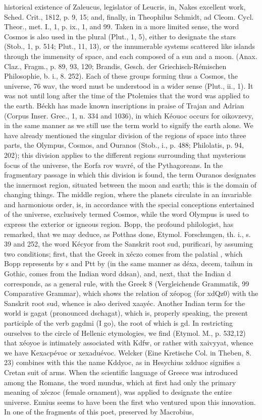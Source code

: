 historical existence of Zaleucus, legislator of Leucris, in, Nakes excellent work, Sched. Crit., 1812, p. 9, 15; and, finally, in Theophilus Schmidt, ad Cleom. Cycl. Theor., met. I., 1, p. ix., 1, and 99. Taken in a more limited sense, the word Cosmos is also used in the plural (Plut., 1, 5), either to designate the stars (Stob., 1, p. 514; Plut., 11, 13), or the innumerable systems scattered like islands through the immensity of space, and each composed of a sun and a moon. (Anax. Claz., Fragm., p. 89, 93, 120; Brandis, Gesch. der Griechisch-R\'{e}mischen Philosophie, b. i., 8. 252). Each of these groups forming thus a Cosmos, the universe, 76 wav, the word must be understood in a wider sense (Plut., ii., 1). It was not until long after the time of the Ptolemies that the word was applied to the earth. B\'{e}ckh has made known inscriptions in praise of Trajan and Adrian (Corpus Inser. Grec., 1, n. 334 and 1036), in which K\'{e}ouoc occurs for oikovzevy, in the same manner as we still use the term world to signify the earth alone. We have already mentioned the singular division of the regions of space into three parts, the Olympus, Cosmos, and Ouranos (Stob., i., p. 488; Philolatis, p. 94, 202); this division applies to the different regions surrounding that mysterious focus of the universe, the Eorfa rov wavr\'{e}, of the Pythagoreans. In the fragmentary passage in which this division is found, the term Ouranos designates the innermost region, situated between the moon and earth; this is the domain of changing things. The middle region, where the planets circulate in an invariable and harmonious order, is, in accordance with the special conceptions entertained of the universe, exclusively termed Cosmos, while the word Olympus is used to express the exterior or igneous region. Bopp, the profound philologist, has remarked, that we may deduce, as Potthas done, Etymol. Forschungen, th. i., s. 39 and 252, the word K\'{e}cyor from the Sanskrit root sud, purificari, by assuming two conditions; first, that the Greek  in x\'{e}czo comes from the palatial , which Bopp represents by s and Ptt by  (in the same manner as d\'{e}xa, decem, taihun in Gothic, comes from the Indian word ddsan), and, next, that the Indian d corresponds, as a general rule, with the Greek 8 (Vergleichende Grammatik,  99 Comparative Grammar), which shows the relation of x\'{e}opog (for xdQz0) with the Sanskrit root sud, whence is also derived xaay\'{e}c. Another Indian term for the world is gagat (pronounced dschagat), which is, properly speaking, the present participle of the verb gagdmi (I go), the root of which is gd. In restricting ourselves to the circle of Hellenic etymologies, we find (Etymol. M., p. 532,12) that x\'{e}oyoe is intimately associated with Kdfw, or rather with xaivyyat, whence we have Kexacp\'{e}voc or xexadu\'{e}voc. Welcker (Eine Kretische Col. in Theben, 8. 23) combines with this the name Kddyoc, as in Hesychius xdduoc signifies a Cretan suit of arms. When the scientific language of Greece was introduced among the Romans, the word mundus, which at first had only the primary meaning of x\'{e}czoc (female ornament), was applied to designate the entire universe. Ennius seems to have been the first who ventured upon this innovation. In one of the fragments of this poet, preserved by Macrobius, 